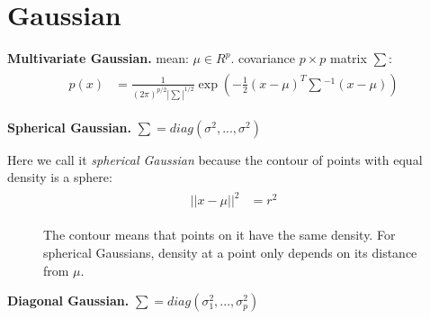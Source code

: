 \section{Gaussian}
\textbf{Multivariate Gaussian.}\hspace{0.2cm} mean: $\mu \in R^p$. covariance $p\times p$
matrix $\sum$:
\begin{align}
\begin{split}
	p(x) &= \frac{1}{(2\pi)^{p/2} |\sum|^{1/2}} \exp(-\frac{1}{2} (x-\mu)^T \sum {}^{-1} (x-\mu))
\end{split}
\end{align}


\textbf{Spherical Gaussian.}\hspace{0.2cm} $\sum = diag(\sigma^2, ..., \sigma^2)$

Here we call it \textit{spherical Gaussian} because the contour of points with equal density is a sphere:
\begin{align}
\begin{split}
||x - \mu||^2 &= r^2
\end{split}
\end{align}

\begin{figure}[h]
\caption{The contour means that points on it have the same density. For spherical Gaussians, density at a point only depends on its distance from $\mu$.}
\end{figure}





\textbf{Diagonal Gaussian.}\hspace{0.2cm} $\sum = diag(\sigma_1^2, ..., \sigma_p^2)$

